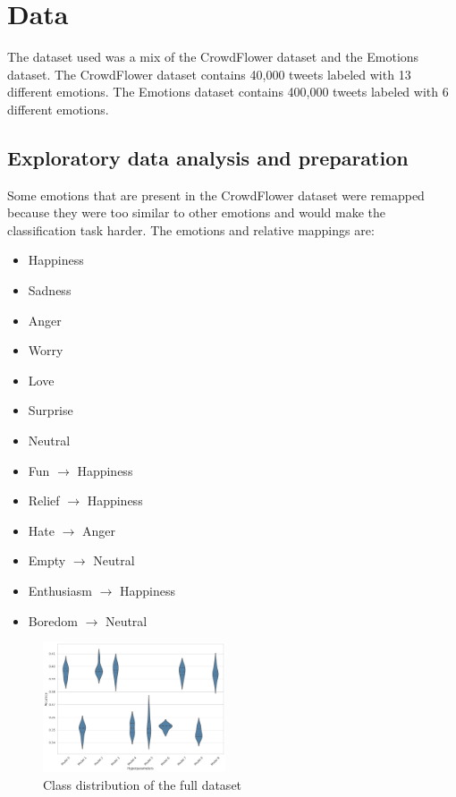 \section{Data}
The dataset used was a mix of the CrowdFlower 
dataset\cite{crowdflower_dataset} and the
Emotions dataset\cite{emotions_dataset}.
The CrowdFlower dataset contains 40,000 tweets
labeled with 13 different emotions. The Emotions 
dataset contains 400,000 tweets labeled with 6 
different emotions.

\subsection{Exploratory data analysis and preparation}
Some emotions that are present in the
CrowdFlower dataset were remapped because they
were too similar to other emotions and 
would make the classification task harder.
The emotions and relative mappings are:
\begin{itemize}
    \item Happiness
    \item Sadness
    \item Anger
    \item Worry
    \item Love
    \item Surprise
    \item Neutral
    \item Fun $\rightarrow$ Happiness
    \item Relief $\rightarrow$ Happiness
    \item Hate $\rightarrow$ Anger
    \item Empty $\rightarrow$ Neutral
    \item Enthusiasm $\rightarrow$ Happiness
    \item Boredom $\rightarrow$ Neutral
\end{itemize}

\begin{figure}[H]
    \centering
    \includegraphics[width=0.48\textwidth]{images/violin_plot_decision_tree.png}
    \caption{Class distribution of the full dataset}
    \label{fig:class_distribution}
\end{figure}

